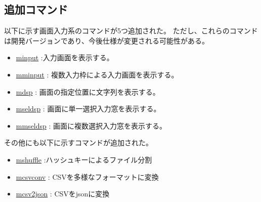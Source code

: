 \subsection{追加コマンド}
以下に示す画面入力系のコマンドが5つ追加された。
ただし、これらのコマンドは開発バージョンであり、今後仕様が変更される可能性がある。
\begin{itemize}
\item \hyperref[sect:minput] {minput} :入力画面を表示する。
\item \hyperref[sect:mminput] {mminput} : 複数入力枠による入力画面を表示する。
\item \hyperref[sect:mdsp] {mdsp} : 画面の指定位置に文字列を表示する。
\item \hyperref[sect:mseldsp] {mseldsp} : 画面に単一選択入力窓を表示する。
\item \hyperref[sect:mmseldsp] {mmseldsp} : 画面に複数選択入力窓を表示する。
\end{itemize}

その他にも以下に示すコマンドが追加された。
\begin{itemize}
\item \hyperref[sect:mshuffle] {mshuffle} :ハッシュキーによるファイル分割
\item \hyperref[sect:mcsvconv] {mcsvconv} : CSVを多様なフォーマットに変換
\item \hyperref[sect:mcsv2json] {mcsv2json} : CSVをjsonに変換
\end{itemize}

%

